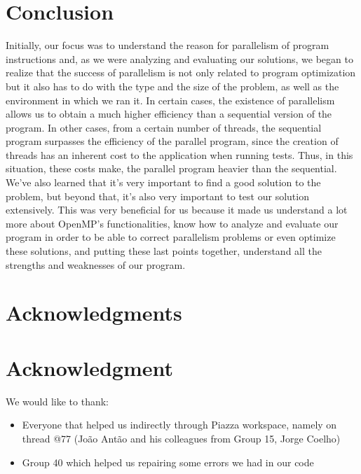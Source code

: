 \documentclass[10pt,journal,compsoc]{IEEEtran}
\begin{document}
\section{Conclusion}
Initially, our focus was to understand the reason for parallelism of program instructions and, as we were analyzing and evaluating our solutions, we began to realize that the success of parallelism is not only related to program optimization but it also has to do with the type and the size of the problem, as well as the environment in which we ran it. In certain cases, the existence of parallelism allows us to obtain a much higher efficiency than a sequential version of the program. In other cases, from a certain number of threads, the sequential program surpasses the efficiency of the parallel program, since the creation of threads has an inherent cost to the application when running tests. Thus, in this situation, these costs make, the parallel program heavier than the sequential.\\
We've also learned that it's very important to find a good solution to the problem, but beyond that, it's also very important to test our solution extensively. This was very beneficial for us because it made us understand a lot more about OpenMP's functionalities, know how to analyze and evaluate our program in order to be able to correct parallelism problems or even optimize these solutions, and putting these last points together, understand all the strengths and weaknesses of our program.



\ifCLASSOPTIONcompsoc
  \section*{Acknowledgments}
\else
  \section*{Acknowledgment}
\fi


We would like to thank:
\begin{itemize}
    \item Everyone that helped us indirectly through Piazza workspace, namely on thread @77 (João Antão and his colleagues from Group 15, Jorge Coelho)
    \item Group 40 which helped us repairing some errors we had in our code 
\end{itemize}
\end{document}
